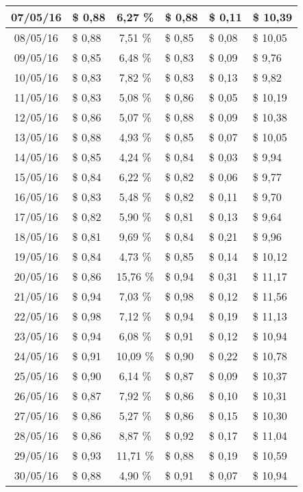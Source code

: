 \begin{center}
\begin{small}
\begin{longtable}{|c|l|c|l|l|l|}
07/05/16 & \$ 0,88 & 6,27 \% & \$ 0,88 & \$ 0,11 & \$ 10,39 \\ \hline
08/05/16 & \$ 0,88 & 7,51 \% & \$ 0,85 & \$ 0,08 & \$ 10,05 \\ \hline
09/05/16 & \$ 0,85 & 6,48 \% & \$ 0,83 & \$ 0,09 & \$ 9,76 \\ \hline
10/05/16 & \$ 0,83 & 7,82 \% & \$ 0,83 & \$ 0,13 & \$ 9,82 \\ \hline
11/05/16 & \$ 0,83 & 5,08 \% & \$ 0,86 & \$ 0,05 & \$ 10,19 \\ \hline
12/05/16 & \$ 0,86 & 5,07 \% & \$ 0,88 & \$ 0,09 & \$ 10,38 \\ \hline
13/05/16 & \$ 0,88 & 4,93 \% & \$ 0,85 & \$ 0,07 & \$ 10,05 \\ \hline
14/05/16 & \$ 0,85 & 4,24 \% & \$ 0,84 & \$ 0,03 & \$ 9,94 \\ \hline
15/05/16 & \$ 0,84 & 6,22 \% & \$ 0,82 & \$ 0,06 & \$ 9,77 \\ \hline
16/05/16 & \$ 0,83 & 5,48 \% & \$ 0,82 & \$ 0,11 & \$ 9,70 \\ \hline
17/05/16 & \$ 0,82 & 5,90 \% & \$ 0,81 & \$ 0,13 & \$ 9,64 \\ \hline
18/05/16 & \$ 0,81 & 9,69 \% & \$ 0,84 & \$ 0,21 & \$ 9,96 \\ \hline
19/05/16 & \$ 0,84 & 4,73 \% & \$ 0,85 & \$ 0,14 & \$ 10,12 \\ \hline
20/05/16 & \$ 0,86 & 15,76 \% & \$ 0,94 & \$ 0,31 & \$ 11,17 \\ \hline
21/05/16 & \$ 0,94 & 7,03 \% & \$ 0,98 & \$ 0,12 & \$ 11,56 \\ \hline
22/05/16 & \$ 0,98 & 7,12 \% & \$ 0,94 & \$ 0,19 & \$ 11,13 \\ \hline
23/05/16 & \$ 0,94 & 6,08 \% & \$ 0,91 & \$ 0,12 & \$ 10,94 \\ \hline
24/05/16 & \$ 0,91 & 10,09 \% & \$ 0,90 & \$ 0,22 & \$ 10,78 \\ \hline
25/05/16 & \$ 0,90 & 6,14 \% & \$ 0,87 & \$ 0,09 & \$ 10,37 \\ \hline
26/05/16 & \$ 0,87 & 7,92 \% & \$ 0,86 & \$ 0,10 & \$ 10,31 \\ \hline
27/05/16 & \$ 0,86 & 5,27 \% & \$ 0,86 & \$ 0,15 & \$ 10,30 \\ \hline
28/05/16 & \$ 0,86 & 8,87 \% & \$ 0,92 & \$ 0,17 & \$ 11,04 \\ \hline
29/05/16 & \$ 0,93 & 11,71 \% & \$ 0,88 & \$ 0,19 & \$ 10,59 \\ \hline
30/05/16 & \$ 0,88 & 4,90 \% & \$ 0,91 & \$ 0,07 & \$ 10,94 \\ \hline

\end{longtable}
\end{small}
\end{center}
